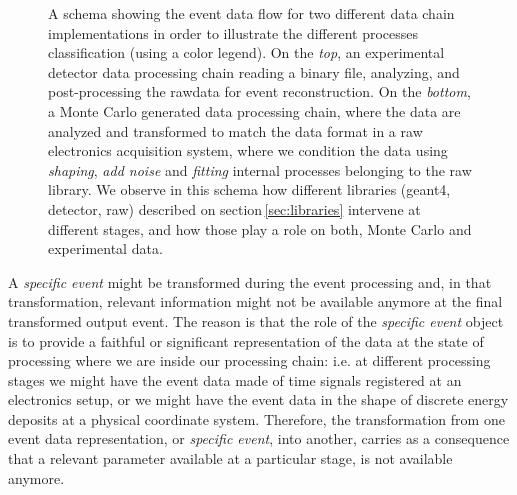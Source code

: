 \begin{figure}[tb]
  \centering
	\caption{A schema showing the event data flow for two different data chain implementations in order to illustrate the different processes classification (using a color legend). On the \emph{top}, an experimental detector data processing chain reading a binary file, analyzing, and post-processing the rawdata for event reconstruction. On the \emph{bottom}, a Monte Carlo generated data processing chain, where the data are analyzed and transformed to match the data format in a raw electronics acquisition system, where we condition the data using \emph{shaping}, \emph{add noise} and \emph{fitting} internal processes belonging to the raw library. We observe in this schema how different libraries (geant4, detector, raw) described on section\,\ref{sec:libraries} intervene at different stages, and how those play a role on both, Monte Carlo and experimental data.}  \label{fig:dataChain}
\end{figure}

A \emph{specific event} might be transformed during the event processing and, in that transformation, relevant information might not be available anymore at the final transformed output event. The reason is that the role of the \emph{specific event} object is to provide a faithful or significant representation of the data at the state of processing where we are inside our processing chain: i.e. at different processing stages we might have the event data made of time signals registered at an electronics setup, or we might have the event data in the shape of discrete energy deposits at a physical coordinate system. Therefore, the transformation from one event data representation, or \emph{specific event}, into another, carries as a consequence that a relevant parameter available at a particular stage, is not available anymore.

